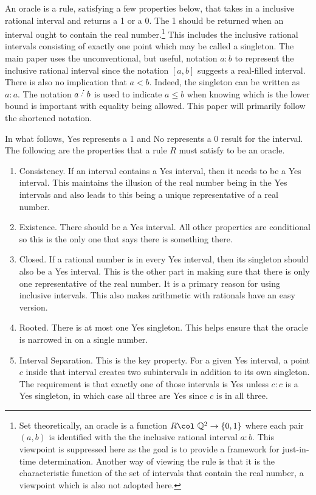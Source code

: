 \documentclass[12pt]{article}
\theoremstyle{remark}
\begin{document}
An oracle is a rule, satisfying a few properties below, that takes in a inclusive rational interval and returns a 1 or a 0. The 1 should be returned when an interval ought to contain the real number.\footnote{Set theoretically, an oracle is a function $R \col \ \mathbb{Q}^2 \to \{0,1\}$ where each pair $(a,b)$ is identified with the  the inclusive rational interval $a:b$. This viewpoint is suppressed here as the goal is to provide a framework for just-in-time determination. Another way of viewing the rule is that it is the characteristic function of the set of intervals that contain the real number, a viewpoint which is also not adopted here.} This includes the inclusive rational intervals consisting of exactly one point which may be called a singleton. The main paper uses the unconventional, but useful, notation $a:b$ to represent the inclusive rational interval since the notation $[a,b]$ suggests a real-filled interval. There is also no implication that $a < b$.  Indeed, the singleton can be written as $a:a$. The notation $a\lte b$ is used to indicate $a\leq b$ when knowing which is the lower bound is important with equality being allowed. This paper will primarily follow the shortened notation. 

In what follows, Yes represents a 1 and No represents a 0 result for the interval. The following are the properties that a rule $R$ must satisfy to be an oracle. 

\begin{enumerate}
    \item Consistency. If an interval contains a Yes interval, then it needs to be a Yes interval. This maintains the illusion of the real number being in the Yes intervals and also leads to this being a unique representative of a real number. 
    \item Existence. There should be a Yes interval. All other properties are conditional so this is the only one that says there is something there. 
    \item Closed. If a rational number is in every Yes interval, then its singleton should also be a Yes interval. This is the other part in making sure that there is only one representative of the real number. It is a primary reason for using inclusive intervals. This also makes arithmetic with rationals have an easy version.
    \item Rooted. There is at most one Yes singleton.  This helps ensure that the oracle is narrowed in on a single number. 
    \item Interval Separation. This is the key property. For a given Yes interval, a point $c$ inside that interval creates two subintervals in addition to its own singleton. The requirement is that exactly one of those intervals is Yes unless $c:c$ is a Yes singleton, in which case all three are Yes since $c$ is in all three.  
\end{enumerate}
\end{document}

